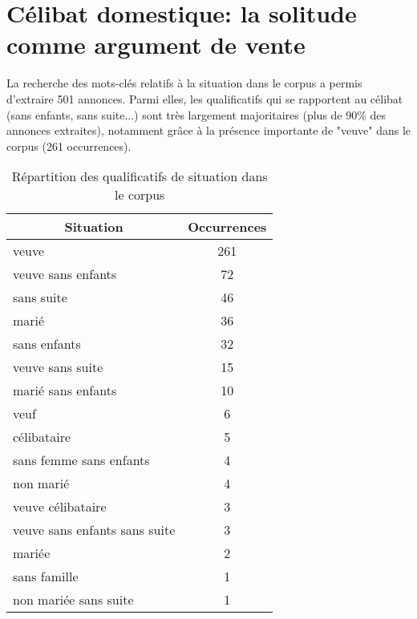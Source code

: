 \section{Célibat domestique: la solitude comme argument de vente}

La recherche des mots-clés relatifs à la situation dans le corpus a permis d'extraire 501 annonces. Parmi elles, les qualificatifs qui se rapportent au célibat (sans enfants, sans suite...) sont très largement majoritaires (plus de 90\% des annonces extraites), notamment grâce à la présence importante de "veuve" dans le corpus (261 occurrences). 


\begin{table}[ht]
	\centering
	\begin{tabular}{lc}
		\hline
		\multicolumn{1}{c}{\textbf{Situation}} & \textbf{Occurrences} \\ \hline
		veuve                                            & 261                  \\
		veuve sans enfants                               & 72                   \\
		sans suite                                       & 46                   \\
		marié                                            & 36                   \\
		sans enfants                                     & 32                   \\
		veuve sans suite                                 & 15                   \\
		marié sans enfants                               & 10                   \\
		veuf                                             & 6                    \\
		célibataire                                      & 5                    \\
		sans femme sans enfants                          & 4                    \\
		non marié                                        & 4                    \\
		veuve célibataire                                & 3                    \\
		veuve sans enfants sans suite                    & 3                    \\
		mariée                                           & 2                    \\
		sans famille                                     & 1                    \\
		non mariée sans suite                            & 1                    \\ \hline
	\end{tabular}
	\caption{Répartition des qualificatifs de situation dans le corpus}
\end{table}

